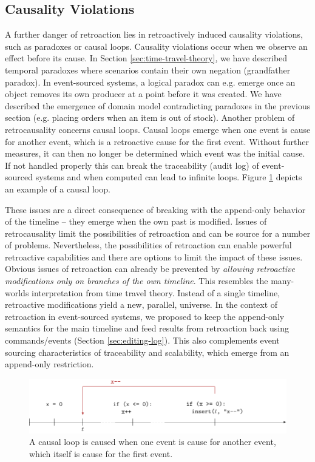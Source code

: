 \subsection{Causality Violations}
\label{sec:causality-violations}
A further danger of retroaction lies in retroactively induced causality violations, 
such as paradoxes or causal loops. Causality violations occur when we observe an 
effect before its cause. In Section \ref{sec:time-travel-theory}, we have 
described temporal paradoxes where scenarios contain their own negation 
(grandfather paradox). In event-sourced systems, a logical paradox can e.g. 
emerge once an object removes its own producer at a point before it was created.
We have described the emergence of domain model contradicting paradoxes
in the previous section (e.g. placing orders when an item is out of stock). 
%
Another problem of retrocausality concerns causal loops. Causal loops emerge 
when one event is cause for another event, which is a retroactive cause for the 
first event. Without further measures, it can then no longer be determined 
which event was the initial cause. If not handled properly this can break the 
traceability (audit log) of event-sourced systems and when computed can lead to 
infinite loops.  Figure \ref{fig:causal-loop} depicts an example of a causal loop.

These issues are a direct consequence of breaking with the append-only behavior 
of the timeline -- they emerge when the own past is modified. Issues of 
retrocausality limit the possibilities of retroaction and can be source for a 
number of problems. Nevertheless, the possibilities of retroaction can enable 
powerful retroactive capabilities and there are options to limit the impact of 
these issues.
Obvious issues of retroaction can already be prevented by 
\emph{allowing retroactive modifications only on branches of the own timeline}.
This resembles the many-worlds interpretation from time travel theory.
Instead of a single timeline, retroactive modifications yield a new, parallel, 
universe. In the context of retroaction in event-sourced systems, we proposed 
to keep the append-only semantics for the main timeline and feed results from 
retroaction back using commands/events (Section \ref{sec:editing-log}). This 
also complements event sourcing characteristics of traceability and scalability, 
which emerge from an append-only restriction.

\begin{figure}
        \centering
        \includegraphics[width=1.0\textwidth]{../illustrations/causal-loop.pdf}

        \caption{
                A causal loop is caused when one event is cause for
                another event, which itself is cause for the first event.
        }
        \label{fig:causal-loop}
\end{figure}

